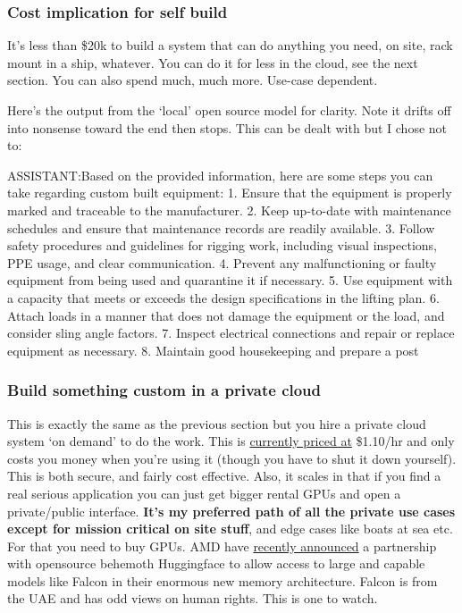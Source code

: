 \subsubsection{Cost implication for self build}
It's less than \$20k to build a system that can do anything you need, on site, rack mount in a ship, whatever. You can do it for less in the cloud, see the next section. You can also spend much, much more. Use-case dependent.\par
Here's the output from the `local' open source model for clarity. Note it drifts off into nonsense toward the end then stops. This can be dealt with but I chose not to:
\begin{tcolorbox}[enhanced, frame style={fill=lightgray}, interior style={fill=lightgray}]
ASSISTANT:Based on the provided information, here are some steps you can take regarding custom built equipment: 
1. Ensure that the equipment is properly marked and traceable to the manufacturer. 
2. Keep up-to-date with maintenance schedules and ensure that maintenance records are readily available. 
3. Follow safety procedures and guidelines for rigging work, including visual inspections, PPE usage, and clear communication. 
4. Prevent any malfunctioning or faulty equipment from being used and quarantine it if necessary. 
5. Use equipment with a capacity that meets or exceeds the design specifications in the lifting plan. 
6. Attach loads in a manner that does not damage the equipment or the load, and consider sling angle factors. 
7. Inspect electrical connections and repair or replace equipment as necessary. 
8. Maintain good housekeeping and prepare a post
\end{tcolorbox}

\subsubsection{Build something custom in a private cloud}
This is exactly the same as the previous section but you hire a private cloud system `on demand' to do the work. This is \href{https://lambdalabs.com/service/gpu-cloud/pricing}{currently priced at} \$1.10/hr and only costs you money when you're using it (though you have to shut it down yourself). This is both secure, and fairly cost effective. Also, it scales in that if you find a real serious application you can just get bigger rental GPUs and open a private/public interface. \textbf{It's my preferred path of all the private use cases except for mission critical on site stuff}, and edge cases like boats at sea etc. For that you need to buy GPUs. AMD have \href{https://www.amd.com/en/newsroom/press-releases/2023-6-13-amd-expands-leadership-data-center-portfolio-with-.html}{recently announced} a partnership with opensource behemoth Huggingface to allow access to large and capable models like Falcon in their enormous new memory architecture. Falcon is from the UAE and has odd views on human rights. This is one to watch.
